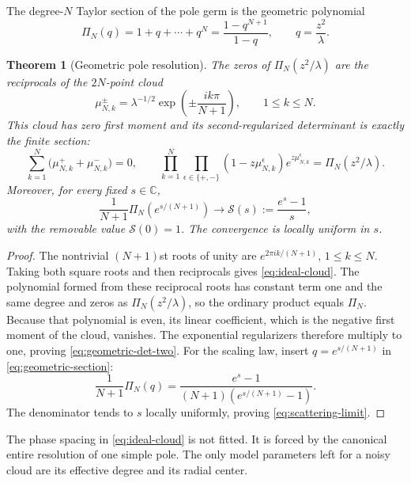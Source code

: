 \documentclass[11pt]{article}
\newtheorem{theorem}{Theorem}[section]
\theoremstyle{definition}
\theoremstyle{remark}
\newcommand{\C}{\mathbb C}
\newcommand{\cS}{\mathcal S}
\begin{document}
The degree-$N$ Taylor section of the pole germ is the geometric polynomial
\begin{equation}\label{eq:geometric-section}
 \Pi_N(q)=1+q+\cdots+q^N
 =\frac{1-q^{N+1}}{1-q},
 \qquad q=\frac{z^2}{\lambda}.
\end{equation}

\begin{theorem}[Geometric pole resolution]
\label{thm:geometric-resolution}
The zeros of $\Pi_N(z^2/\lambda)$ are the reciprocals of the $2N$-point
cloud
\begin{equation}\label{eq:ideal-cloud}
 \mu_{N,k}^{\pm}
 =\lambda^{-1/2}
 \exp\left(\pm\frac{ik\pi}{N+1}\right),
 \qquad 1\le k\le N.
\end{equation}
This cloud has zero first moment and its second-regularized determinant is
exactly the finite section:
\begin{equation}\label{eq:geometric-det-two}
 \sum_{k=1}^N\bigl(\mu_{N,k}^++\mu_{N,k}^-\bigr)=0,
 \qquad
 \prod_{k=1}^N\prod_{\epsilon\in\{+,-\}}
 (1-z\mu_{N,k}^{\epsilon})e^{z\mu_{N,k}^{\epsilon}}
 =\Pi_N(z^2/\lambda).
\end{equation}
Moreover, for every fixed $s\in\C$,
\begin{equation}\label{eq:scattering-limit}
 \frac1{N+1}\Pi_N\!\left(e^{s/(N+1)}\right)
 \longrightarrow
 \cS(s):=\frac{e^s-1}{s},
\end{equation}
with the removable value $\cS(0)=1$.  The convergence is locally uniform in
$s$.
\end{theorem}

\begin{proof}
The nontrivial $(N+1)$st roots of unity are
$e^{2\pi ik/(N+1)}$, $1\le k\le N$.  Taking both square roots and then
reciprocals gives \eqref{eq:ideal-cloud}.  The polynomial formed from these
reciprocal roots has constant term one and the same degree and zeros as
$\Pi_N(z^2/\lambda)$, so the ordinary product equals $\Pi_N$.  Because that
polynomial is even, its linear coefficient, which is the negative first
moment of the cloud, vanishes.  The exponential regularizers therefore
multiply to one, proving \eqref{eq:geometric-det-two}.  For the scaling law,
insert
$q=e^{s/(N+1)}$ in \eqref{eq:geometric-section}:
\[
 \frac1{N+1}\Pi_N(q)
 =\frac{e^s-1}{(N+1)(e^{s/(N+1)}-1)}.
\]
The denominator tends to $s$ locally uniformly, proving
\eqref{eq:scattering-limit}.
\end{proof}

The phase spacing in \eqref{eq:ideal-cloud} is not fitted.  It is forced by
the canonical entire resolution of one simple pole.  The only model
parameters left for a noisy cloud are its effective degree and its radial
center.
\end{document}
